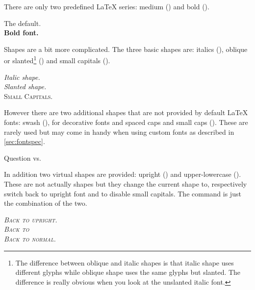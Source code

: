 There are only two predefined \LaTeX{} series: medium () and bold ().
\begin{example}
\textmd{The default.} \\
\textbf{Bold font.}
\end{example}

Shapes are a bit more complicated. The three basic shapes are: italics
(), oblique or slanted\footnote{The difference between oblique and
  italic shapes is that italic shape uses different glyphs while oblique shape
  uses the same glyphs but slanted. The difference is really obvious
  \selectfont when you look at the unslanted italic font.}
() and small capitals ().
\begin{example}
\textit{Italic shape.} \\
\textsl{Slanted shape.} \\
\textsc{Small Capitals.}
\end{example}
However there are two additional shapes that are not provided by default
\LaTeX{} fonts: swash (), for decorative fonts and spaced caps and
small caps (). These are rarely used but may come in handy when
using custom fonts as described in \autoref{sec:fontspec}.
\begin{example}
\setmainfont{EB Garamond} %
Question vs. 
\end{example}
In addition two virtual shapes are provided: upright () and
upper-lowercase (). These are not actually shapes but they change
the current shape to, respectively switch back to upright font and to disable
small capitals. The command  is just the combination of the
two.
\begin{example}
\textsl{\textsc{Back to
  \textup{upright.}}} \\
\textsl{\textsc{Back to
  }} \\
\textsl{\textsc{Back to
  \textnormal{normal.}}}
\end{example}

